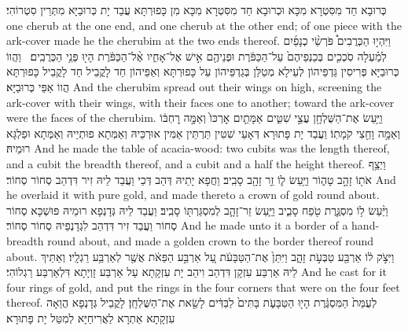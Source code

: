 {{כְּרוּבָא חַד מִסִּטְרָא מִכָּא וּכְרוּבָא חַד מִסִּטְרָא מִכָּא מִן כָּפוּרְתָּא עֲבַד יָת כְּרוּבַיָּא מִתְּרֵין סִטְרוֹהִי׃}
{one cherub at the one end, and one cherub at the other end; of one piece with the ark-cover made he the cherubim at the two ends thereof.}{}
{וַיִּהְי֣וּ הַכְּרֻבִים֩ פֹּרְשֵׂ֨י כְנָפַ֜יִם לְמַ֗עְלָה סֹֽכְכִ֤ים בְּכַנְפֵיהֶם֙ עַל־הַכַּפֹּ֔רֶת וּפְנֵיהֶ֖ם אִ֣ישׁ אֶל־אָחִ֑יו אֶ֨ל־הַכַּפֹּ֔רֶת הָי֖וּ פְּנֵ֥י הַכְּרֻבִֽים׃ \petucha }
{וַהֲווֹ כְּרוּבַיָּא פְּרִיסִין גַּדְפֵּיהוֹן לְעֵילָא מְטַלַּן בְּגַדְפֵּיהוֹן עַל כָּפוּרְתָּא וְאַפֵּיהוֹן חַד לָקֳבֵיל חַד לָקֳבֵיל כָּפוּרְתָּא הֲווֹ אַפֵּי כְּרוּבַיָּא׃}
{And the cherubim spread out their wings on high, screening the ark-cover with their wings, with their faces one to another; toward the ark-cover were the faces of the cherubim.}{}
{וַיַּ֥עַשׂ אֶת־הַשֻּׁלְחָ֖ן עֲצֵ֣י שִׁטִּ֑ים אַמָּתַ֤יִם אׇרְכּוֹ֙ וְאַמָּ֣ה רׇחְבּ֔וֹ וְאַמָּ֥ה וָחֵ֖צִי קֹמָתֽוֹ׃}
{וַעֲבַד יָת פָּתוּרָא דְּאָעֵי שִׁטִּין תַּרְתֵּין אַמִּין אוּרְכֵּיהּ וְאַמְּתָא פוּתְיֵיהּ וְאַמְּתָא וּפַלְגָּא רוּמֵיהּ׃}
{And he made the table of acacia-wood: two cubits was the length thereof, and a cubit the breadth thereof, and a cubit and a half the height thereof.}{}
{וַיְצַ֥ף אֹת֖וֹ זָהָ֣ב טָה֑וֹר וַיַּ֥עַשׂ ל֛וֹ זֵ֥ר זָהָ֖ב סָבִֽיב׃}
{וַחֲפָא יָתֵיהּ דְּהַב דְּכֵי וַעֲבַד לֵיהּ זִיר דִּדְהַב סְחוֹר סְחוֹר׃}
{And he overlaid it with pure gold, and made thereto a crown of gold round about.}{}
{וַיַּ֨עַשׂ ל֥וֹ מִסְגֶּ֛רֶת טֹ֖פַח סָבִ֑יב וַיַּ֧עַשׂ זֵר־זָהָ֛ב לְמִסְגַּרְתּ֖וֹ סָבִֽיב׃}
{וַעֲבַד לֵיהּ גְּדָנְפָא רוּמֵיהּ פּוּשְׁכָּא סְחוֹר סְחוֹר וַעֲבַד זִיר דִּדְהַב לִגְדָנְפֵיהּ סְחוֹר סְחוֹר׃}
{And he made unto it a border of a hand-breadth round about, and made a golden crown to the border thereof round about.}{}
{וַיִּצֹ֣ק ל֔וֹ אַרְבַּ֖ע טַבְּעֹ֣ת זָהָ֑ב וַיִּתֵּן֙ אֶת־הַטַּבָּעֹ֔ת עַ֚ל אַרְבַּ֣ע הַפֵּאֹ֔ת אֲשֶׁ֖ר לְאַרְבַּ֥ע רַגְלָֽיו׃}
{וְאַתֵּיךְ לֵיהּ אַרְבַּע עִזְקָן דִּדְהַב וִיהַב יָת עִזְקָתָא עַל אַרְבַּע זָוְיָתָא דִּלְאַרְבַּע רַגְלוֹהִי׃}
{And he cast for it four rings of gold, and put the rings in the four corners that were on the four feet thereof.}{}
{לְעֻמַּת֙ הַמִּסְגֶּ֔רֶת הָי֖וּ הַטַּבָּעֹ֑ת בָּתִּים֙ לַבַּדִּ֔ים לָשֵׂ֖את אֶת־הַשֻּׁלְחָֽן׃}
{לָקֳבֵיל גְּדָנְפָא הֲוַאָה עִזְקָתָא אַתְרָא לַאֲרִיחַיָּא לְמִטַּל יָת פָּתוּרָא׃}
}
